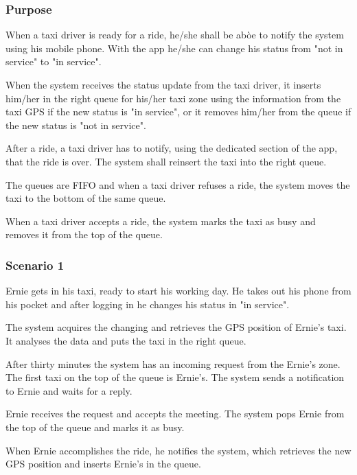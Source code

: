 \label{taxi-availability}
\subsubsection{Purpose}

When a taxi driver is ready for a ride, he/she shall be abòe to notify the system using his mobile phone. With the app he/she can change his status from "not in service" to "in service".

When the system receives the status update from the taxi driver, it inserts him/her in the right queue for his/her taxi zone using the information from the taxi GPS if the new status is "in service", or it removes him/her from the queue if the new status is "not in service".

After a ride, a taxi driver has to notify, using the dedicated section of the app, that the ride is over. The system shall reinsert the taxi into the right queue.

The queues are FIFO and when a taxi driver refuses a ride, the system moves the taxi to the bottom of the same queue.

When a taxi driver accepts a ride, the system marks the taxi as busy and removes it from the top of the queue.

\subsubsection{Scenario 1}
Ernie gets in his taxi, ready to start his working day. He takes out his phone from his pocket and after logging in he changes his status in "in service".

The system acquires the changing and retrieves the GPS position of Ernie's taxi. It analyses the data and puts the taxi in the right queue.

After thirty minutes the system has an incoming request from the Ernie's zone. The first taxi on the top of the queue is Ernie's. The system sends a notification to Ernie and waits for a reply.

Ernie receives the request and accepts the meeting. The system pops Ernie from the top of the queue and marks it as busy.

When Ernie accomplishes the ride, he notifies the system, which retrieves the new GPS position and inserts Ernie's in the queue.

